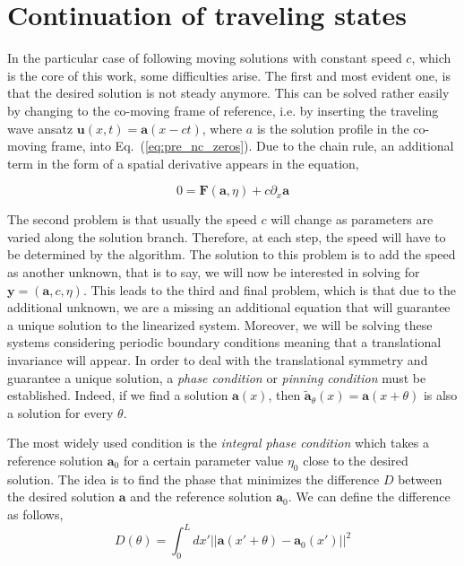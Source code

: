 \section{Continuation of traveling states}

In the particular case of following moving solutions with constant speed $c$, which is
the core of this work, some difficulties arise. The first and most evident one, is that
the desired solution is not steady anymore. This can be solved rather easily by
changing to the co-moving frame of reference, i.e. by inserting the traveling wave
ansatz $\bm{u}(x, t) = \bm{a}(x - ct)$, where $a$ is the solution profile in the co-moving frame,
 into Eq.~(\ref{eq:pre_nc_zeros}). Due to the chain rule,
an additional term in the form of a spatial derivative appears in the equation,

\begin{equation}
    0 = \bm{F}(\bm{a}, \eta) + c\partial_x\bm{a}
\end{equation}

The second problem is that usually the speed $c$ will change as parameters
are varied along the solution branch. Therefore, at
each step, the speed will have to be determined by the 
algorithm. The solution to this problem is to add the speed
as another unknown, that is to say, we will now be interested in solving for 
$\bm{y} = (\bm{a}, c, \eta)$. This leads to the third and final problem, which is that due
to the additional unknown, we are a missing an additional equation that will guarantee
a unique solution to the linearized system. Moreover, we will be solving these systems considering periodic
boundary conditions meaning that a translational invariance will appear. In order to
deal with the translational symmetry and guarantee a unique solution, a {\em phase condition}
or {\em pinning condition} must be established. Indeed, if we find a solution
$\bm{a}(x)$, then $\tilde{\bm{a}}_{\theta}(x) = \bm{a}(x  + \theta)$ is also
a solution for every $\theta$. 

The most widely used condition is the
{\em integral phase condition} \cite{doedel1981auto} which takes a reference solution $\bm{a}_0$ for a certain
parameter value $\eta_0$ close to the desired solution. The idea is to find the phase
that minimizes the difference $D$ between the desired solution $\bm{a}$ and the reference solution
$\bm{a}_0$. We can define the difference as follows,
\begin{equation}
    D(\theta) = \int_0^L dx' 
        \left|\left| \bm{a}(x' + \theta) - \bm{a}_0(x') \right|\right|^2    
\end{equation}

